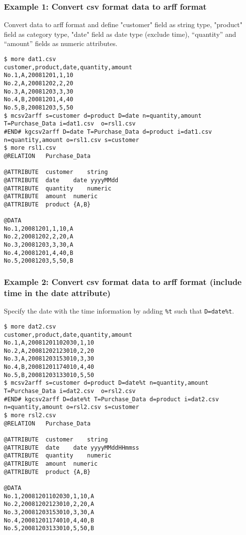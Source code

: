 \subsubsection*{Example 1: Convert csv format data to arff format}

Convert data to arff format and define "customer" field as string type, "product" field as category type, "date" field as date type (exclude time), “quantity” and “amount” fields as numeric attributes.


\begin{Verbatim}[baselinestretch=0.7,frame=single]
$ more dat1.csv
customer,product,date,quantity,amount
No.1,A,20081201,1,10
No.2,A,20081202,2,20
No.3,A,20081203,3,30
No.4,B,20081201,4,40
No.5,B,20081203,5,50
$ mcsv2arff s=customer d=product D=date n=quantity,amount T=Purchase_Data i=dat1.csv  o=rsl1.csv
#END# kgcsv2arff D=date T=Purchase_Data d=product i=dat1.csv n=quantity,amount o=rsl1.csv s=customer
$ more rsl1.csv
@RELATION	Purchase_Data

@ATTRIBUTE	customer	string
@ATTRIBUTE	date	date yyyyMMdd
@ATTRIBUTE	quantity	numeric
@ATTRIBUTE	amount	numeric
@ATTRIBUTE	product	{A,B}

@DATA
No.1,20081201,1,10,A
No.2,20081202,2,20,A
No.3,20081203,3,30,A
No.4,20081201,4,40,B
No.5,20081203,5,50,B
\end{Verbatim}
\subsubsection*{Example 2: Convert csv format data to arff format (include time in the date attribute)}

Specify the date with the time information by adding \verb|%t| such that \verb|D=date%t|.


\begin{Verbatim}[baselinestretch=0.7,frame=single]
$ more dat2.csv
customer,product,date,quantity,amount
No.1,A,20081201102030,1,10
No.2,A,20081202123010,2,20
No.3,A,20081203153010,3,30
No.4,B,20081201174010,4,40
No.5,B,20081203133010,5,50
$ mcsv2arff s=customer d=product D=date%t n=quantity,amount T=Purchase_Data i=dat2.csv  o=rsl2.csv
#END# kgcsv2arff D=date%t T=Purchase_Data d=product i=dat2.csv n=quantity,amount o=rsl2.csv s=customer
$ more rsl2.csv
@RELATION	Purchase_Data

@ATTRIBUTE	customer	string
@ATTRIBUTE	date	date yyyyMMddHHmmss
@ATTRIBUTE	quantity	numeric
@ATTRIBUTE	amount	numeric
@ATTRIBUTE	product	{A,B}

@DATA
No.1,20081201102030,1,10,A
No.2,20081202123010,2,20,A
No.3,20081203153010,3,30,A
No.4,20081201174010,4,40,B
No.5,20081203133010,5,50,B
\end{Verbatim}
